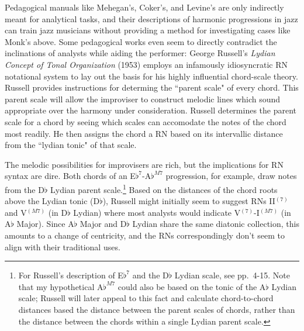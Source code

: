 Pedagogical manuals like Mehegan's, Coker's, and Levine's are only indirectly meant for analytical tasks, and their descriptions of harmonic progressions in jazz can train jazz musicians without providing a method for investigating cases like Monk's above.  Some pedagogical works even seem to directly contradict the inclinations of analysts while aiding the performer: George Russell's \emph{Lydian Concept of Tonal Organization} (1953) employs an infamously idiosyncratic RN notational system to lay out the basis for his highly influential chord-scale theory.  Russell provides instructions for determing the ``parent scale" of every chord.  This parent scale will allow the improviser to construct melodic lines which sound appropriate over the harmony under consideration.  Russell determines the parent scale for a chord by seeing which scales can accomodate the notes of the chord most readily.  He then assigns the chord a RN based on its intervallic distance from the ``lydian tonic" of that scale.

The melodic possibilities for improvisers are rich, but the implications for RN syntax are dire.  Both chords of an E$\flat ^7$-A$\flat^{M7}$ progression, for example, draw notes from the D$\flat$ Lydian parent scale.\footnote{For Russell's description of E$\flat^7$ and the D$\flat$ Lydian scale, see pp.\ 4-15.  Note that my hypothetical A$\flat^{M7}$ could also be based on the tonic of the A$\flat$ Lydian scale; Russell will later appeal to this fact and calculate chord-to-chord distances based the distance between the parent scales of chords, rather than the distance between the chords within a single Lydian parent scale.}  Based on the distances of the chord roots above the Lydian tonic (D$\flat$), Russell might initially seem to suggest RNs II$^{(7)}$ and V$^{(M7)}$ (in D$\flat$ Lydian) where most analysts would indicate V$^{(7)}$-I$^{(M7)}$ (in A$\flat$ Major).  Since A$\flat$ Major and D$\flat$ Lydian share the same diatonic collection, this amounts to a change of centricity, and the RNs correspondingly don't seem to align with their traditional uses.

